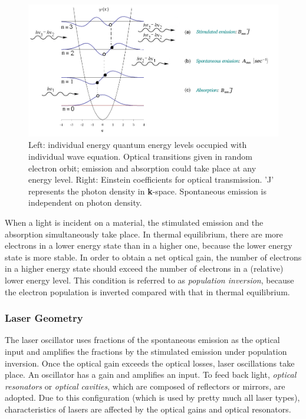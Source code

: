 \begin{figure}[ht!]
\centering
\includegraphics[scale=0.4]{chapters/img/laser.png}
\caption{Left: individual energy quantum energy levels occupied with individual wave equation. Optical transitions given in random electron orbit; emission and absorption could take place at any energy level. Right: Einstein coefficients for optical transmission. 'J' represents the photon density in \textbf{k}-space. Spontaneous emission is independent on photon density.}
\label{fig:laser}
\end{figure}
 
When a light is incident on a material, the stimulated emission and the absorption simultaneously take place. In thermal equilibrium, there are more electrons in a lower energy state than in a higher one, because the lower energy state is more stable. In order to obtain a net optical gain, the number of electrons in a higher energy state should exceed the number of electrons in a (relative) lower energy level. This condition is referred to as \textit{population inversion}, because the electron population is inverted compared with that in thermal equilibrium. 
 
 	
	\subsubsection{Laser Geometry}
The \acs{laser} oscillator uses fractions of the spontaneous emission as the optical input and amplifies the fractions by the stimulated emission under population inversion. Once the optical gain exceeds the optical losses, laser oscillations take place. An oscillator has a gain and amplifies an input. To feed back light, \textit{optical resonators} or \textit{optical cavities}, which are composed of reflectors or mirrors, are adopted. Due to this configuration (which is used by pretty much all \acs{laser} types), characteristics of \acs{laser}s are affected by the optical gains and optical resonators. 

